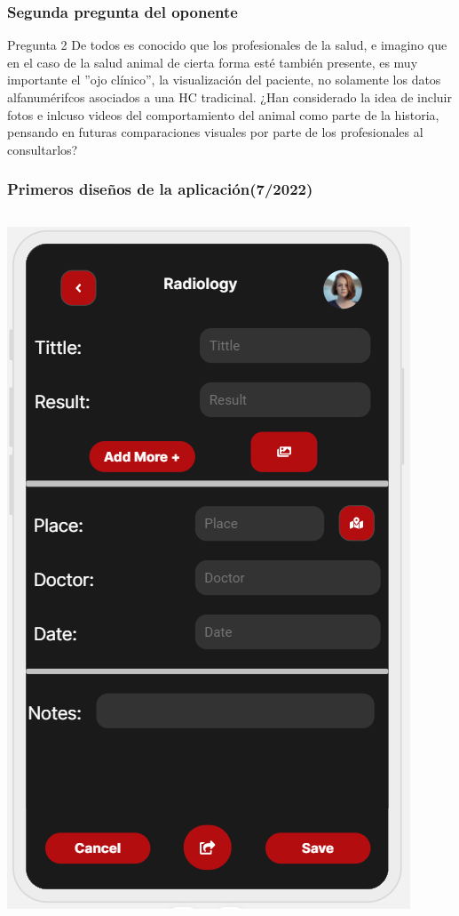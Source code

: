 \documentclass[14pt]{beamer}
\begin{document}
\begin{frame}
\frametitle{Segunda pregunta del oponente}
\begin{block}{Pregunta 2}
De todos es conocido que los profesionales de la salud, e imagino que en el caso de la salud animal de cierta forma esté también presente, es muy importante el ''ojo clínico'', la visualización del paciente, no solamente los datos alfanumérifcos asociados a una HC tradicinal. ¿Han considerado la idea de incluir fotos e inlcuso videos del comportamiento del animal como parte de la historia, pensando en futuras comparaciones visuales por parte de los profesionales al consultarlos?
\end{block}
\end{frame}



\begin{frame}
\frametitle{Primeros diseños de la aplicación(7/2022)}


\begin{columns}
\begin{column}{0.5\textwidth}
\begin{center}

\includegraphics[scale = 0.35]{Images/photoExample.png}


\end{center}
\end{column}
\end{columns}
\end{frame}
\end{document}
